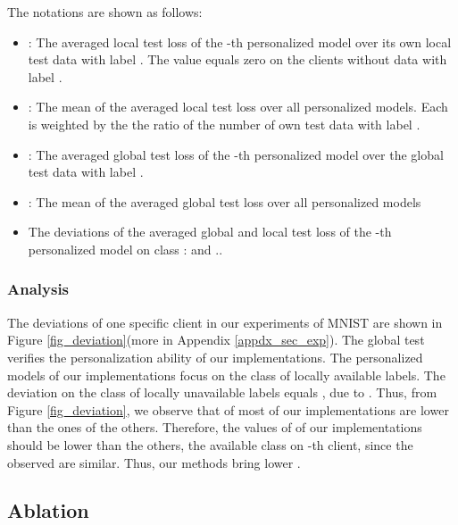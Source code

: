 \documentclass{article}
\begin{document}
The notations are shown as follows:
\begin{itemize}
    \item : The averaged local test loss of the -th personalized model over its own local test data with label . The value equals zero on the clients without data with label .
    \item : The mean of the averaged local test loss over all personalized models. Each  is weighted by the the ratio of the number of own test data with label .
    \item : The averaged global test loss of the -th personalized model over the global test data with label .
    \item : The mean of the averaged global test loss over all personalized models
    \item The deviations of the averaged global and local test loss of the -th personalized model on class :  and ..
\end{itemize}

\subsubsection{Analysis}

The deviations of one specific client in our experiments of MNIST are shown in Figure \ref{fig_deviation}(more in Appendix \ref{appdx_sec_exp}). The global test verifies the personalization ability of our implementations. The personalized models of our implementations focus on the class of locally available labels. The deviation on  the class of locally unavailable labels  equals , due to . Thus, from Figure \ref{fig_deviation}, we observe that  of most of our implementations are lower than the ones of the others. Therefore, the values of  of our implementations should be lower than the others,  the available class on -th client, since the observed  are similar. Thus, our methods bring lower .

\subsection{Ablation}
\label{ssec_ablation}
\end{document}
